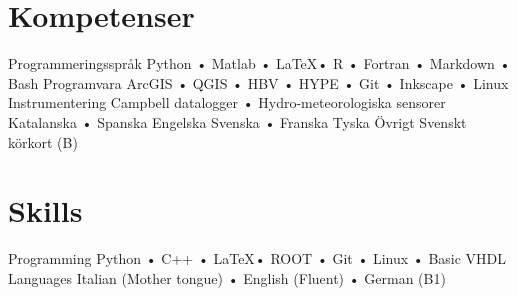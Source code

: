 \ifswedish
  \section{Kompetenser}
    \skill
      {Programmeringsspråk}
      {Python • Matlab • \LaTeX • R • Fortran • Markdown • Bash}
    \skill
      {Programvara}
      {ArcGIS • QGIS • HBV • HYPE • Git • Inkscape • Linux}
    \skill
      {Instrumentering}
      {Campbell datalogger • Hydro-meteorologiska sensorer}
    \languages
      {Katalanska • Spanska}
      {Engelska}
      {Svenska • Franska}
      {Tyska}
    \skill
      {Övrigt}
      {Svenskt körkort (B)}
\else
  \section{Skills}
    \skill
      {Programming}
      {Python • C++ • \LaTeX • ROOT • Git • Linux • Basic VHDL}
    \skill
      {Languages}
      {Italian (Mother tongue) • English (Fluent) • German (B1)}
   \fi
